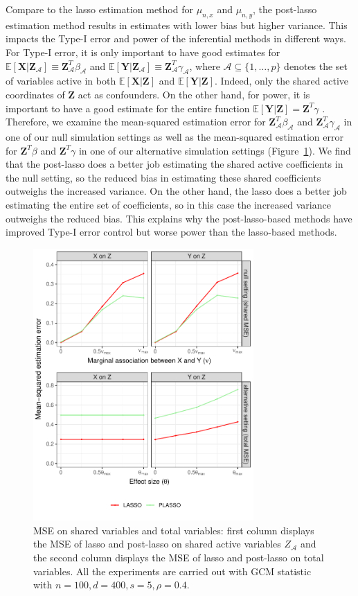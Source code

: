 \documentclass[aos]{imsart}
\theoremstyle{plain}
\theoremstyle{remark}
\newcommand{\E}{\mathbb E}								%
\newcommand{\prx}{\bm X}								%
\newcommand{\prz}{\bm Z}								%
\newcommand{\pry}{{\bm Y}}								%
\begin{document}
Compare to the lasso estimation method for $\mu_{n,x}$ and $\mu_{n,y}$, the post-lasso estimation method results in estimates with lower bias but higher variance. This impacts the Type-I error and power of the inferential methods in different ways. For Type-I error, it is only important to have good estimates for $\E[\prx|\prz_{\mathcal A}] \equiv \prz_{\mathcal A}^T\beta_{\mathcal A}$ and $\E[\pry|\prz_{\mathcal A}] \equiv \prz_{\mathcal A}^T \gamma_{\mathcal A}$, where $\mathcal A \subseteq \{1, \dots, p\}$ denotes the set of variables active in both $\E[\prx|\prz]$ and $\E[\pry|\prz]$. Indeed, only the shared active coordinates of $\prz$ act as confounders. On the other hand, for power, it is important to have a good estimate for the entire function $\E[\pry|\prz] = \prz^T \gamma$  \citep{Katsevich2020a}. Therefore, we examine the mean-squared estimation error for $\prz_{\mathcal A}^T\beta_{\mathcal A}$ and $\prz_{\mathcal A}^T\gamma_{\mathcal A}$ in one of our null simulation settings as well as the mean-squared estimation error for $\prz^T \beta$ and $\prz^T\gamma$ in one of our alternative simulation settings (Figure~\ref{fig:MSE}). We find that the post-lasso does a better job estimating the shared active coefficients in the null setting, so the reduced bias in estimating these shared coefficients outweighs the increased variance. On the other hand, the lasso does a better job estimating the entire set of coefficients, so in this case the increased variance outweighs the reduced bias. This explains why the post-lasso-based methods have improved Type-I error control but worse power than the lasso-based methods.

\begin{figure}[!ht]
	\centering
	\includegraphics[width = 0.75\textwidth]{figures/MSE.pdf}
	\caption{MSE on shared variables and total variables: first column displays the MSE of lasso and post-lasso on shared active variables $Z_{\mathcal{A}}$ and the second column displays the MSE of lasso and post-lasso on total variables. All the experiments are carried out with GCM statistic with $n=100,d=400,s=5,\rho=0.4$.}
	\label{fig:MSE}
\end{figure}
\end{document}
